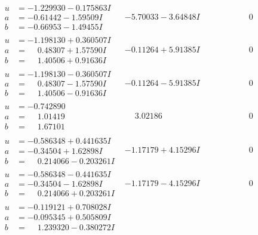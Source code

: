 \documentclass[1p]{elsarticle_modified}
\theoremstyle{definition}
\begin{document}
$$\begin{array}{c|c|c}
 \hline 
\begin{aligned}
u &= -1.229930 - 0.175863 I \\
a &= -0.61442 - 1.59509 I \\
b &= -0.66953 - 1.49455 I\end{aligned}
 & -5.70033 - 3.64848 I & \phantom{-0.000000 } 0 \\ \hline\begin{aligned}
u &= -1.198130 + 0.360507 I \\
a &= \phantom{-}0.48307 + 1.57590 I \\
b &= \phantom{-}1.40506 + 0.91636 I\end{aligned}
 & -0.11264 + 5.91385 I & \phantom{-0.000000 } 0 \\ \hline\begin{aligned}
u &= -1.198130 - 0.360507 I \\
a &= \phantom{-}0.48307 - 1.57590 I \\
b &= \phantom{-}1.40506 - 0.91636 I\end{aligned}
 & -0.11264 - 5.91385 I & \phantom{-0.000000 } 0 \\ \hline\begin{aligned}
u &= -0.742890\phantom{ +0.000000I} \\
a &= \phantom{-}1.01419\phantom{ +0.000000I} \\
b &= \phantom{-}1.67101\phantom{ +0.000000I}\end{aligned}
 & \phantom{-}3.02186\phantom{ +0.000000I} & \phantom{-0.000000 } 0 \\ \hline\begin{aligned}
u &= -0.586348 + 0.441635 I \\
a &= -0.34504 + 1.62898 I \\
b &= \phantom{-}0.214066 - 0.203261 I\end{aligned}
 & -1.17179 + 4.15296 I & \phantom{-0.000000 } 0 \\ \hline\begin{aligned}
u &= -0.586348 - 0.441635 I \\
a &= -0.34504 - 1.62898 I \\
b &= \phantom{-}0.214066 + 0.203261 I\end{aligned}
 & -1.17179 - 4.15296 I & \phantom{-0.000000 } 0 \\ \hline\begin{aligned}
u &= -0.119121 + 0.708028 I \\
a &= -0.095345 + 0.505809 I \\
b &= \phantom{-}1.239320 - 0.380272 I\end{aligned}

\end{array}$$
\end{document}
